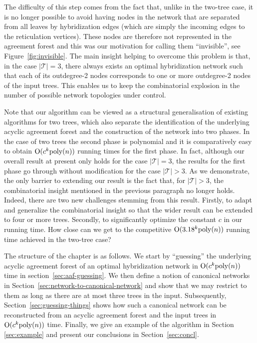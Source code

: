 The difficulty of this step comes from the fact that, unlike in the two-tree case, it is no longer possible to avoid having nodes in the network that are separated from all leaves by hybridization edges (which are simply the incoming edges to the reticulation vertices). These nodes are therefore not represented in the agreement forest and this was our motivation for calling them ``invisible'', see Figure~\ref{fig:invisible}. The main insight helping to overcome this problem is that, in the case $|\mathcal{T}|=3$, there always exists an optimal hybridization network such that each of its outdegree-2 nodes corresponds to one or more outdegree-2 nodes of the input trees. This enables us to keep the combinatorial explosion in the number of possible network topologies under control. 


Note that our algorithm can be viewed as a structural generalisation of existing algorithms for two trees, which also separate the identification of the underlying acyclic agreement forest and the construction of the network into two phases. In the case of two trees the second phase is polynomial and it is comparatively easy to obtain $\mathrm{O}(c^k \text{poly}(n))$  running times for the first phase. In fact, although our overall result at present only  holds for the case $|\mathcal{T}|=3$, the results for the first phase go through without modification for the case $|\mathcal{T}| > 3$. As we demonstrate, the only barrier to extending our result is the fact that, for $|\mathcal{T}|>3$, the combinatorial insight mentioned in the previous paragraph no longer holds. Indeed, there are two new challenges stemming from this result. Firstly, to adapt and generalize the combinatorial insight so that the wider result can be extended to four or more trees. Secondly, to significantly optimize the constant $c$ in our running time. How close can we get to the competitive $\mathrm{O}(3.18^k \text{poly}(n))$ running time achieved in the two-tree case?

The structure of the chapter is as follows. We start by ``guessing'' the underlying acyclic agreement forest of an optimal hybridization network in $\mathrm{O}(c^k \text{poly}(n))$  time in section~\ref{sec:aaf-guessing}. We then define a notion of canonical networks in Section~\ref{sec:network-to-canonical-network} %
and show that we may restrict to them as long as there are at most three trees in the input. Subsequently, Section~\ref{sec:guessing-things} shows how such a canonical network can be reconstructed from an acyclic agreement forest and the input trees in $\mathrm{O}(c^k \text{poly}(n))$ time. Finally, we give an example of the algorithm in Section \ref{sec:example} and present our conclusions in Section~\ref{sec:concl}.





